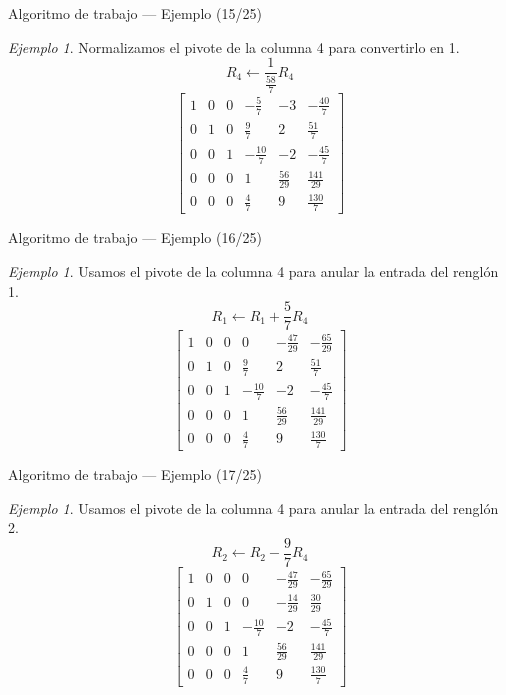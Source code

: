 \documentclass[aspectratio=169,11pt]{beamer}
\theoremstyle{remark}
\newtheorem{Ejem}[definicion]{Ejemplo}
\begin{document}
\begin{frame}{Algoritmo de trabajo — Ejemplo (15/25)}
\begin{Ejem}
Normalizamos el pivote de la columna 4 para convertirlo en 1.
\[
R_{4}\leftarrow \frac{1}{\frac{58}{7}}R_{4}
\]
\[
\left[\begin{array}{ccccc|c}
1 & 0 & 0 & - \frac{5}{7} & -3 & - \frac{40}{7}\\
0 & 1 & 0 & \frac{9}{7} & 2 & \frac{51}{7}\\
0 & 0 & 1 & - \frac{10}{7} & -2 & - \frac{45}{7}\\
0 & 0 & 0 & 1 & \frac{56}{29} & \frac{141}{29}\\
0 & 0 & 0 & \frac{4}{7} & 9 & \frac{130}{7}
\end{array}\right]
\]
\end{Ejem}
\end{frame}

\begin{frame}{Algoritmo de trabajo — Ejemplo (16/25)}
\begin{Ejem}
Usamos el pivote de la columna 4 para anular la entrada del renglón 1.
\[
R_{1}\leftarrow R_{1}+\frac{5}{7}R_{4}
\]
\[
\left[\begin{array}{ccccc|c}
1 & 0 & 0 & 0 & - \frac{47}{29} & - \frac{65}{29}\\
0 & 1 & 0 & \frac{9}{7} & 2 & \frac{51}{7}\\
0 & 0 & 1 & - \frac{10}{7} & -2 & - \frac{45}{7}\\
0 & 0 & 0 & 1 & \frac{56}{29} & \frac{141}{29}\\
0 & 0 & 0 & \frac{4}{7} & 9 & \frac{130}{7}
\end{array}\right]
\]
\end{Ejem}
\end{frame}

\begin{frame}{Algoritmo de trabajo — Ejemplo (17/25)}
\begin{Ejem}
Usamos el pivote de la columna 4 para anular la entrada del renglón 2.
\[
R_{2}\leftarrow R_{2}-\frac{9}{7}R_{4}
\]
\[
\left[\begin{array}{ccccc|c}
1 & 0 & 0 & 0 & - \frac{47}{29} & - \frac{65}{29}\\
0 & 1 & 0 & 0 & - \frac{14}{29} & \frac{30}{29}\\
0 & 0 & 1 & - \frac{10}{7} & -2 & - \frac{45}{7}\\
0 & 0 & 0 & 1 & \frac{56}{29} & \frac{141}{29}\\
0 & 0 & 0 & \frac{4}{7} & 9 & \frac{130}{7}
\end{array}\right]
\]
\end{Ejem}
\end{frame}
\end{document}
